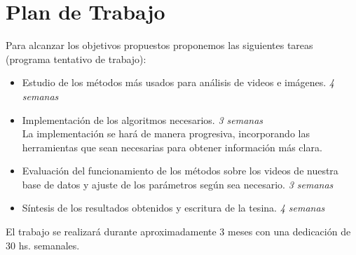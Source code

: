 \section{Plan de Trabajo}
\iffalse
Se recomienda estructurar esta sección en función de los objetivos específicos.
* Planteo de la hipotesis a analizar en cada objetivo o seccion del proyecto.
* Actividades propuestas y metodologıa a usar en cada una de ellas.
* Resultados que se esperan obtener o metas a cumplir y como se evaluaran
los resultados.
Trate de evaluar los potenciales problemas y limitaciones de la metodolog ́ıa
y t ́ecnicas propuestas y en lo posible proponer alternativas.
\fi

Para alcanzar los objetivos propuestos proponemos las siguientes tareas (programa tentativo de trabajo):
\begin{itemize}
  \item Estudio de los métodos más usados para análisis de videos e imágenes. \textit{4 semanas}
  \item Implementación de los algoritmos necesarios. \textit{3 semanas}
    \\ La implementación se hará de manera progresiva, incorporando las herramientas que
    sean necesarias para obtener información más clara.
  \item Evaluación del funcionamiento de los métodos sobre los videos de nuestra base de datos y
  ajuste de los parámetros según sea necesario. \textit{3 semanas}
  \item Síntesis de los resultados obtenidos y escritura de la tesina. \textit{4 semanas}
\end{itemize}
El trabajo se realizará durante aproximadamente 3 meses con una dedicación de 30 hs. semanales.

